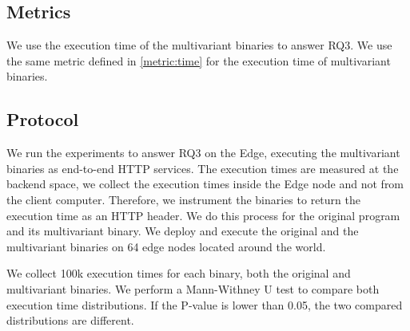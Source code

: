 \subsection*{Metrics}

We use the execution time of the multivariant binaries to answer RQ3. We use the same metric defined in \autoref{metric:time} for the execution time of multivariant binaries.

\subsection*{Protocol}


We run the experiments to answer RQ3 on the Edge, executing the multivariant binaries as end-to-end HTTP services. 
The execution times are measured at the backend space, \ie we collect the execution times inside the Edge node and not from the client computer. Therefore, we instrument the binaries to return the execution time as an HTTP header. We do this process for the original program and its multivariant binary. We deploy and execute the original and the multivariant binaries on 64 edge nodes located around the world.


We collect 100k execution times for each binary, both the original and multivariant binaries.
We perform a Mann-Withney U test \cite{mann1947} to compare both execution time distributions. 
If the P-value is lower than 0.05, the two compared distributions are different.